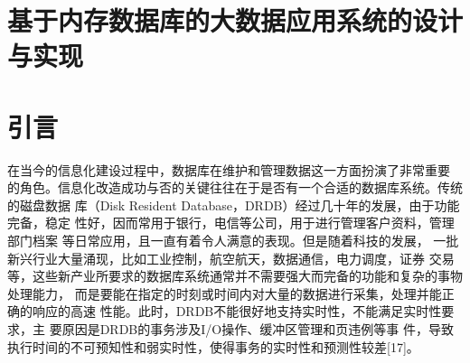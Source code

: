 \documentclass[literaturereview]{zjutreport}
\begin{document}



\frontmatter

\begingroup %
\let\clearpage\relax %

\titleformat{\chapter}[block]{\sihao\heiti\filcenter\bfseries}{\CJKnumber{\thechapter}}{1ex}{}{} %
\chapter*{基于内存数据库的大数据应用系统的设计与实现}
{} %


\mainmatter
\chapter{引言}
在当今的信息化建设过程中，数据库在维护和管理数据这一方面扮演了非常重要
的角色。信息化改造成功与否的关键往往在于是否有一个合适的数据库系统。传统的磁盘数据
库（Disk Resident Database，DRDB）经过几十年的发展，由于功能完备，稳定
性好，因而常用于银行，电信等公司，用于进行管理客户资料，管理部门档案
等日常应用，且一直有着令人满意的表现。但是随着科技的发展，
一批新兴行业大量涌现，比如工业控制，航空航天，数据通信，电力调度，证券
交易等，这些新产业所要求的数据库系统通常并不需要强大而完备的功能和复杂的事物处理能力，
而是要能在指定的时刻或时间内对大量的数据进行采集，处理并能正确的响应的高速
性能。此时，DRDB不能很好地支持实时性，不能满足实时性要求，主
要原因是DRDB的事务涉及I/O操作、缓冲区管理和页违例等事
件，导致执行时间的不可预知性和弱实时性，使得事务的实时性和预测性较差[17]。
\end{document}
